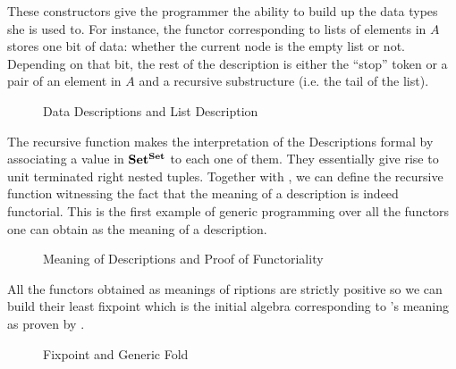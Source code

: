These constructors give the programmer the ability to build up the data
types she is used to. For instance, the functor corresponding to lists
of elements in $A$ stores one bit of data: whether the current node is
the empty list or not. Depending on that bit, the rest of the description
is either the ``stop'' token or a pair of an element in $A$ and a
recursive substructure (i.e. the tail of the list).

\begin{figure}[h]
\begin{minipage}{0.45\textwidth}
\end{minipage}\hspace{2em}
\begin{minipage}{0.45\textwidth}
\end{minipage}
\caption{Data Descriptions and List Description}\label{figure:listD}
\end{figure}

The recursive function  makes the interpretation of the
Descriptions formal by associating a value in $\mathbf{Set}{}^{\mathbf{Set}}{}$ to
each one of them. They essentially give rise to unit terminated
right nested tuples. Together with , we can define the
 recursive function witnessing the fact that the meaning
of a description is indeed functorial. This is the first example
of generic programming over all the functors one can obtain as
the meaning of a description.

\begin{figure}[h]
\begin{minipage}{0.35\textwidth}
\end{minipage}\hspace{2em}
\begin{minipage}{0.55\textwidth}
\end{minipage}
\caption{Meaning of Descriptions and Proof of Functoriality}
\end{figure}

All the functors obtained as meanings of riptions are strictly
positive so we can build their least fixpoint  which is the initial
algebra corresponding to 's meaning as proven by  .

\begin{figure}[h]
\begin{minipage}{0.45\textwidth}
\end{minipage}\hspace{2em}
\begin{minipage}{0.45\textwidth}
\end{minipage}
\caption{Fixpoint and Generic Fold}
\end{figure}


